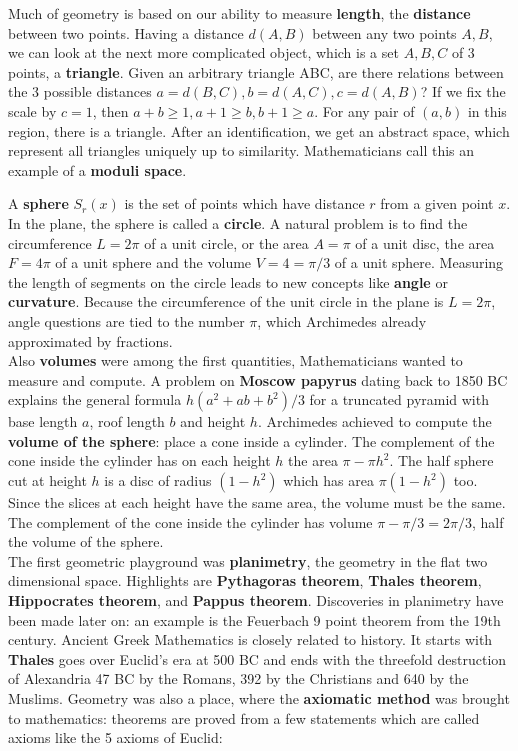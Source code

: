 \documentclass[12pt]{amsart}
\newcounter{example}    \def\example#1{ \item \fontsize{12}{15} \selectfont #1 \fontsize{12}{15} \selectfont }
\begin{document}
Much of geometry is based on our ability to measure {\bf length}, the 
{\bf distance} between two points.  
Having a distance $d(A,B)$ between any two points $A,B$, we can look at 
the next more complicated object, which is a set $A,B,C$ of 3 points, 
a {\bf triangle}. Given an arbitrary triangle ABC, are there relations 
between the 3 possible distances $a=d(B,C),b=d(A,C),c=d(A,B)$? 
If we fix the scale by $c=1$, then $a+b \geq 1, a+1 \geq b, b+1 \geq a$. For any 
pair of $(a,b)$ in this region, there is a triangle. 
After an identification, we get an abstract space, which represent all
triangles uniquely up to similarity. 
Mathematicians call this an example of a {\bf moduli space}. \\ 

A {\bf sphere} $S_r(x)$ is the set of points which have distance $r$ from a given point $x$.
In the plane, the sphere is called a {\bf circle}.
A natural problem is to find the circumference $L=2 \pi$ of a unit circle,
or the area $A = \pi$ of a unit disc, 
the area $F=4 \pi$ of a unit sphere and the volume $V=4=\pi/3$ of a unit sphere. 
Measuring the length of segments on the circle leads to new 
concepts like {\bf angle} or {\bf curvature}.
Because the circumference of the unit circle in the plane is $L=2\pi$, 
angle questions are tied to the number
$\pi$, which Archimedes already approximated by fractions. \\

Also {\bf volumes} were among the first quantities, Mathematicians wanted to measure and compute.
A problem on {\bf Moscow papyrus} dating back to 1850 BC
explains the general formula $h (a^2 + a b + b^2)/3$ for a truncated pyramid with base length $a$, 
roof length $b$ and height $h$. %
Archimedes achieved to compute the  {\bf volume of the sphere}:
place a cone inside a cylinder. 
The complement of the cone inside the cylinder has on each height $h$
the area $\pi - \pi h^2$. 
The half sphere cut at height $h$ is a disc of radius $(1-h^2)$ which has area
$\pi(1-h^2)$ too. Since the slices at each height have the same area, the volume must be the same. 
The complement of the cone inside the cylinder has 
volume $\pi - \pi/3 = 2\pi/3$, half the volume of the sphere.  \\

The first geometric playground was {\bf planimetry}, the geometry in the flat two dimensional space.
Highlights are {\bf Pythagoras theorem}, {\bf Thales theorem}, {\bf Hippocrates theorem}, 
and {\bf Pappus theorem}. Discoveries in planimetry have been made later on:
an example is the Feuerbach 9 point theorem from the 19th century.
Ancient Greek Mathematics is closely related to history. 
It starts with {\bf Thales} goes over Euclid's era at 500 BC and
ends with the threefold destruction of Alexandria 
47 BC by the Romans, 392 by the Christians and 640 by the Muslims.  
Geometry was also a place, where the {\bf axiomatic method} 
was brought to mathematics: theorems are proved from a 
few statements which are called axioms like the 5 axioms of Euclid: 
\end{document}
